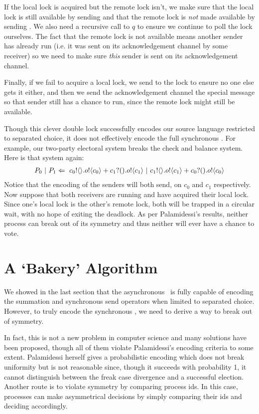 If the local lock is acquired but the remote lock isn't, we make sure that the local lock is still available by sending  and that the remote lock is \emph{not} made available by sending .  
We also need a recursive call to $q$ to ensure we continue to poll the lock ourselves.  
The fact that the remote lock is not available means another sender has already run (i.e. it was sent \ptrue on its acknowledgement channel by some receiver) so we need to make sure \emph{this} sender is sent \pfalse on its acknowledgement channel.

Finally, if we fail to acquire a local lock, we send \pfalse to the lock to ensure no one else gets it either, and then we send the acknowledgement channel the special message \pretry so that sender still has a chance to run, since the remote lock might still be available.

Though this clever double lock successfully encodes our source language restricted to separated choice, it does not effectively encode the full synchronous \picalc.  
For example, our two-party electoral system breaks the check and balance system.  Here is that system again:
\begin{align}
	P_0\ |\  P_1 \Leftarrow\  {c_0}!\langle{}\rangle. {o}!\langle{c_0}\rangle + {c_1}?({}). {o}!\langle{c_1}\rangle \ |\  {c_1}!\langle{}\rangle. {o}!\langle{c_1}\rangle + {c_0}?({}). {o}!\langle{c_0}\rangle
\end{align}
Notice that the encoding of the senders will both send, on $c_0$ and $c_1$ respectively.  
Now suppose that both receivers are running and have acquired their local lock.  
Since one's local lock is the other's remote lock, both will be trapped in a circular wait, with no hope of exiting the deadlock.  
As per Palamidessi's results, neither process can break out of its symmetry and thus neither will ever have a chance to vote.

\section{A `Bakery' Algorithm}
We showed in the last section that the asynchronous \picalc\ is fully capable of encoding the summation and synchronous send operators when limited to separated choice.
However, to truly encode the synchronous \picalc, we need to derive a way to break out of symmetry.

In fact, this is not a new problem in computer science and many solutions have been proposed, though all of them violate Palamidessi's encoding criteria to some extent.
Palamidessi herself gives a probabilistic encoding \cite{palam01} which does not break uniformity  but is not reasonable  since, though it succeeds with probability 1, it cannot distinguish between the freak case divergence and a successful election.
Another route is to violate symmetry by comparing process ids.
In this case, processes can make asymmetrical decisions by simply comparing their ids and deciding accordingly.

